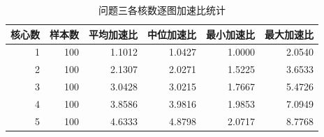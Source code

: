 \begin{table}[htbp]
\caption{问题三各核数逐图加速比统计}\label{tab:q3_mean}
\centering\normalsize\setlength{\tabcolsep}{4pt}
\begin{tabular}{rrrrrr}
\toprule
核心数 & 样本数 & 平均加速比 & 中位加速比 & 最小加速比 & 最大加速比 \\
\midrule
1 & 100 & 1.1012 & 1.0427 & 1.0000 & 2.0540 \\
2 & 100 & 2.1307 & 2.0271 & 1.5225 & 3.6533 \\
3 & 100 & 3.0428 & 3.0215 & 1.7667 & 5.4726 \\
4 & 100 & 3.8586 & 3.9816 & 1.9853 & 7.0949 \\
5 & 100 & 4.6333 & 4.8798 & 2.0717 & 8.7768 \\
\bottomrule\end{tabular}\end{table}
